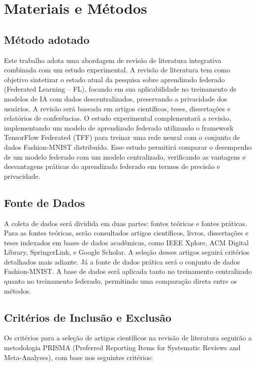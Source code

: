 \chapter[metodologia]{Materiais e Métodos}
\label{chap:metodologia}

\section{Método adotado}

Este trabalho adota uma abordagem de revisão de literatura integrativa combinada com um estudo experimental. A revisão de literatura tem como objetivo sintetizar o estado atual da pesquisa sobre aprendizado federado (Federated Learning – FL), focando em sua aplicabilidade no treinamento de modelos de IA com dados descentralizados, preservando a privacidade dos usuários. A revisão será baseada em artigos científicos, teses, dissertações e relatórios de conferências. O estudo experimental complementará a revisão, implementando um modelo de aprendizado federado utilizando o framework TensorFlow Federated (TFF) para treinar uma rede neural com o conjunto de dados Fashion-MNIST distribuído. Esse estudo permitirá comparar o desempenho de um modelo federado com um modelo centralizado, verificando as vantagens e desvantagens práticas do aprendizado federado em termos de precisão e privacidade.

\section{Fonte de Dados}

A coleta de dados será dividida em duas partes: fontes teóricas e fontes práticas. Para as fontes teóricas, serão consultados artigos científicos, livros, dissertações e teses indexados em bases de dados acadêmicas, como IEEE Xplore, ACM Digital Library, SpringerLink, e Google Scholar. A seleção desses artigos seguirá critérios detalhados mais adiante. Já a fonte de dados prática será o conjunto de dados Fashion-MNIST. A base de dados será aplicada tanto no treinamento centralizado quanto no treinamento federado, permitindo uma comparação direta entre os métodos.

\section{Critérios de Inclusão e Exclusão}

Os critérios para a seleção de artigos científicos na revisão de literatura seguirão a metodologia PRISMA (Preferred Reporting Items for Systematic Reviews and Meta-Analyses), com base nos seguintes critérios:

